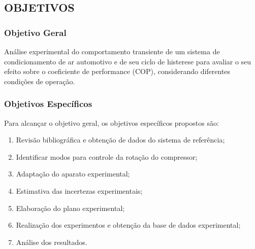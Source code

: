 \subsection{OBJETIVOS}

\subsubsection{Objetivo Geral}

Análise experimental do comportamento transiente de um sistema de condicionamento de ar automotivo e de seu ciclo de histerese para avaliar o seu efeito sobre o coeficiente de performance (COP), considerando diferentes condições de operação.

\subsubsection{Objetivos Específicos}

Para alcançar o objetivo geral, os objetivos específicos propostos são:

\begin{enumerate}[label=\arabic*]
    \item Revisão bibliográfica e obtenção de dados do sistema de referência;
    
    \item Identificar modos para controle da rotação do compressor;
    
    \item Adaptação do aparato experimental;
    
    \item Estimativa das incertezas experimentais;

    \item Elaboração do plano experimental;
    
    \item Realização dos experimentos e obtenção da base de dados experimental;
    
    \item Análise dos resultados.

\end{enumerate}
